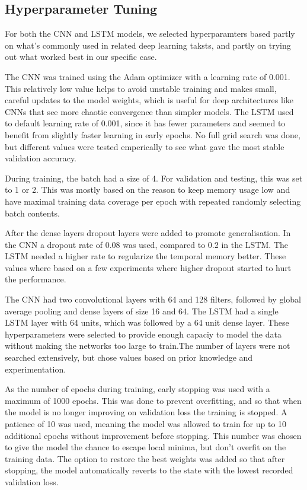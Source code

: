 \documentclass[conference]{IEEEtran}
\begin{document}
 \subsection{Hyperparameter Tuning}
 For both the CNN and LSTM models, we selected hyperparamters based partly on what's commonly used in related deep learning taksts, and partly on trying out what worked best in our specific case.
 
 The CNN was trained using the Adam optimizer with a learning rate of 0.001. This relatively low value helps to avoid unstable training and makes small, careful updates to the model weights, which is useful for deep architectures like CNNs that see more chaotic convergence than simpler models. The LSTM used to default learning rate of 0.001, since it has fewer parameters and seemed to benefit from slightly faster learning in early epochs. No full grid search was done, but different values were tested emperically to see what gave the most stable validation accuracy.
 
 During training, the batch had a size of 4. For validation and testing, this was set to 1 or 2. This was mostly based on the reason to keep memory usage low and have maximal training data coverage per epoch with repeated randomly selecting batch contents.
 
 After the dense layers dropout layers were added to promote generalisation. In the CNN a dropout rate of 0.08 was used, compared to 0.2 in the LSTM. The LSTM needed a higher rate to regularize the temporal memory better. These values where based on a few experiments where higher dropout started to hurt the performance. 
 
 The CNN had two convolutional layers with 64 and 128 filters, followed by global average pooling and dense layers of size 16 and 64. The LSTM had a single LSTM layer with 64 units, which was followed by a 64 unit dense layer. These hyperparameters were selected to provide enough capaciy to model the data without making the networks too large to train.The number of layers were not searched extensively, but chose values based on prior knowledge and experimentation.
 
 As the number of epochs during training, early stopping was used with a maximum of 1000 epochs. This was done to prevent overfitting, and so that when the model is no longer improving on validation loss the training is stopped. A patience of 10 was used, meaning the model was allowed to train for up to 10 additional epochs without improvement before stopping. This number was chosen to give the model the chance to escape local minima, but don't overfit on the training data. The option to restore the best weights was added so that after stopping, the model automatically reverts to the state with the lowest recorded validation loss.
 
\end{document}
